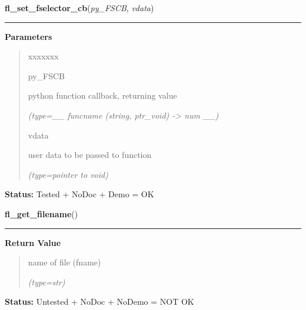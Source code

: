 \hspace{.8\funcindent}\begin{boxedminipage}{\funcwidth}

    \raggedright \textbf{fl\_set\_fselector\_cb}(\textit{py\_FSCB}, \textit{vdata})

    \vspace{-1.5ex}

    \rule{\textwidth}{0.5\fboxrule}
\setlength{\parskip}{2ex}
\setlength{\parskip}{1ex}
      \textbf{Parameters}
      \vspace{-1ex}

      \begin{quote}
        \begin{Ventry}{xxxxxxx}

          \item[py\_FSCB]

          python function callback, returning value

            {\it (type=\_\_ funcname (string, ptr\_void) -{\textgreater} num \_\_)}

          \item[vdata]

          user data to be passed to function

            {\it (type=pointer to void)}

        \end{Ventry}

      \end{quote}

\textbf{Status:} Tested + NoDoc + Demo = OK



    \end{boxedminipage}

    \label{xformslib:flgoodies:fl_get_filename}

    \vspace{0.5ex}

\hspace{.8\funcindent}\begin{boxedminipage}{\funcwidth}

    \raggedright \textbf{fl\_get\_filename}()

    \vspace{-1.5ex}

    \rule{\textwidth}{0.5\fboxrule}
\setlength{\parskip}{2ex}
\setlength{\parskip}{1ex}
      \textbf{Return Value}
    \vspace{-1ex}

      \begin{quote}
      name of file (fname)

      {\it (type=str)}

      \end{quote}

\textbf{Status:} Untested + NoDoc + NoDemo = NOT OK



    \end{boxedminipage}

